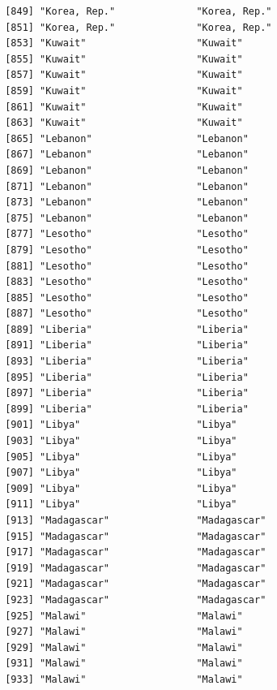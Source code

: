 \documentclass[
  letterpaper,
  DIV=11,
  numbers=noendperiod]{scrreprt}
\begin{document}
\begin{verbatim}
 [849] "Korea, Rep."              "Korea, Rep."             
 [851] "Korea, Rep."              "Korea, Rep."             
 [853] "Kuwait"                   "Kuwait"                  
 [855] "Kuwait"                   "Kuwait"                  
 [857] "Kuwait"                   "Kuwait"                  
 [859] "Kuwait"                   "Kuwait"                  
 [861] "Kuwait"                   "Kuwait"                  
 [863] "Kuwait"                   "Kuwait"                  
 [865] "Lebanon"                  "Lebanon"                 
 [867] "Lebanon"                  "Lebanon"                 
 [869] "Lebanon"                  "Lebanon"                 
 [871] "Lebanon"                  "Lebanon"                 
 [873] "Lebanon"                  "Lebanon"                 
 [875] "Lebanon"                  "Lebanon"                 
 [877] "Lesotho"                  "Lesotho"                 
 [879] "Lesotho"                  "Lesotho"                 
 [881] "Lesotho"                  "Lesotho"                 
 [883] "Lesotho"                  "Lesotho"                 
 [885] "Lesotho"                  "Lesotho"                 
 [887] "Lesotho"                  "Lesotho"                 
 [889] "Liberia"                  "Liberia"                 
 [891] "Liberia"                  "Liberia"                 
 [893] "Liberia"                  "Liberia"                 
 [895] "Liberia"                  "Liberia"                 
 [897] "Liberia"                  "Liberia"                 
 [899] "Liberia"                  "Liberia"                 
 [901] "Libya"                    "Libya"                   
 [903] "Libya"                    "Libya"                   
 [905] "Libya"                    "Libya"                   
 [907] "Libya"                    "Libya"                   
 [909] "Libya"                    "Libya"                   
 [911] "Libya"                    "Libya"                   
 [913] "Madagascar"               "Madagascar"              
 [915] "Madagascar"               "Madagascar"              
 [917] "Madagascar"               "Madagascar"              
 [919] "Madagascar"               "Madagascar"              
 [921] "Madagascar"               "Madagascar"              
 [923] "Madagascar"               "Madagascar"              
 [925] "Malawi"                   "Malawi"                  
 [927] "Malawi"                   "Malawi"                  
 [929] "Malawi"                   "Malawi"                  
 [931] "Malawi"                   "Malawi"                  
 [933] "Malawi"                   "Malawi"                  

\end{verbatim}
\end{document}
